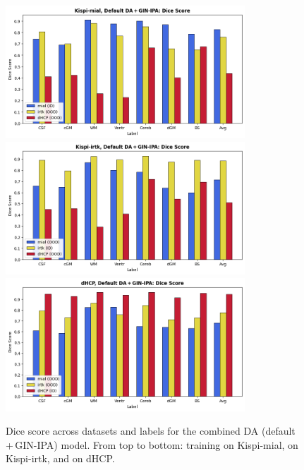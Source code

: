 \begin{figure}[htbp]
    \centering
    \includegraphics[width=0.8\textwidth]{figures/mial_both_DC.png}\\
    \vspace{10pt}
    \includegraphics[width=0.8\textwidth]{figures/irtk_both_DC.png}\\
    \vspace{10pt}
    \includegraphics[width=0.8\textwidth]{figures/dHCP_both_DC.png}
    \caption{Dice score across datasets and labels for the combined DA (default\,+\,GIN-IPA) model. From top to bottom: training on Kispi-mial, on Kispi-irtk, and on dHCP.}
    \label{fig:both_DC}
\end{figure}

